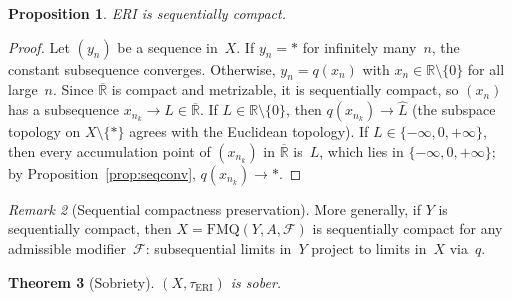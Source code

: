 \documentclass[11pt]{article}
\newtheorem{theorem}{Theorem}[section]
\newtheorem{proposition}[theorem]{Proposition}
\theoremstyle{definition}
\theoremstyle{remark}
\newtheorem{remark}[theorem]{Remark}
\begin{document}
\begin{proposition}\label{prop:seqcpt}
ERI is sequentially compact.
\end{proposition}
\begin{proof}
Let $(y_n)$ be a sequence in~$X$.
If $y_n = \ast$ for infinitely many~$n$, the constant subsequence
converges.
Otherwise, $y_n = q(x_n)$ with $x_n \in \mathbb{R}\setminus\{0\}$
for all large~$n$.
Since $\overline{\mathbb{R}}$ is compact and metrizable, it is
sequentially compact, so $(x_n)$ has a subsequence
$x_{n_k} \to L \in \overline{\mathbb{R}}$.
If $L \in \mathbb{R}\setminus\{0\}$, then $q(x_{n_k}) \to \hat{L}$
(the subspace topology on $X \setminus \{\ast\}$ agrees with the
Euclidean topology).
If $L \in \{-\infty, 0, +\infty\}$, then every accumulation point
of $(x_{n_k})$ in $\overline{\mathbb{R}}$ is~$L$, which lies in
$\{-\infty, 0, +\infty\}$; by
Proposition~\ref{prop:seqconv}, $q(x_{n_k}) \to \ast$.
\end{proof}

\begin{remark}[Sequential compactness preservation]\label{rmk:SCpreserv}
More generally, if $Y$ is sequentially compact, then
$X = \mathrm{FMQ}(Y, A, \mathcal{F})$ is sequentially compact for
any admissible modifier~$\mathcal{F}$: subsequential limits in~$Y$
project to limits in~$X$ via~$q$.
\end{remark}

\begin{theorem}[Sobriety]\label{thm:sober}
$(X, \tau_{\mathrm{ERI}})$ is sober.
\end{theorem}
\end{document}
